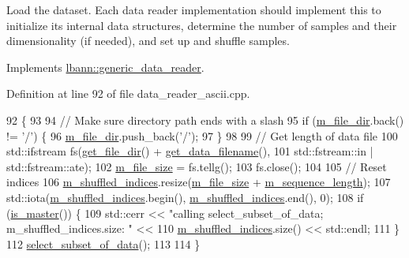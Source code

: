 Load the dataset. Each data reader implementation should implement this to initialize its internal data structures, determine the number of samples and their dimensionality (if needed), and set up and shuffle samples. 

Implements \hyperlink{classlbann_1_1generic__data__reader_afeb47703d988a230a59859cbfc178215}{lbann\+::generic\+\_\+data\+\_\+reader}.



Definition at line 92 of file data\+\_\+reader\+\_\+ascii.\+cpp.


\begin{DoxyCode}
92                         \{
93 
94   \textcolor{comment}{// Make sure directory path ends with a slash}
95   \textcolor{keywordflow}{if} (\hyperlink{classlbann_1_1generic__data__reader_a252002ec211d67606b80bc481a27e820}{m\_file\_dir}.back() != \textcolor{charliteral}{'/'}) \{
96     \hyperlink{classlbann_1_1generic__data__reader_a252002ec211d67606b80bc481a27e820}{m\_file\_dir}.push\_back(\textcolor{charliteral}{'/'});
97   \}
98 
99   \textcolor{comment}{// Get length of data file}
100   std::ifstream fs(\hyperlink{classlbann_1_1generic__data__reader_ab4c6c2d4ba40ece809ce896828c8ff03}{get\_file\_dir}() + \hyperlink{classlbann_1_1generic__data__reader_a56664e1b43f3fe923cf6d652f14b40a9}{get\_data\_filename}(),
101                    std::fstream::in | std::fstream::ate);
102   \hyperlink{classlbann_1_1ascii__reader_af684694c8c7faef296bf5af2530471f3}{m\_file\_size} = fs.tellg();
103   fs.close();
104 
105   \textcolor{comment}{// Reset indices}
106   \hyperlink{classlbann_1_1generic__data__reader_aaab6aeff67ffff1c689336851fec2c57}{m\_shuffled\_indices}.resize(\hyperlink{classlbann_1_1ascii__reader_af684694c8c7faef296bf5af2530471f3}{m\_file\_size} + 
      \hyperlink{classlbann_1_1ascii__reader_a5788fa7418a086de968929d0d4cb4fa4}{m\_sequence\_length});
107   std::iota(\hyperlink{classlbann_1_1generic__data__reader_aaab6aeff67ffff1c689336851fec2c57}{m\_shuffled\_indices}.begin(), \hyperlink{classlbann_1_1generic__data__reader_aaab6aeff67ffff1c689336851fec2c57}{m\_shuffled\_indices}.end(), 0);
108   \textcolor{keywordflow}{if} (\hyperlink{classlbann_1_1generic__data__reader_ae82c40eebc05e2f0c1198afcc7a7f009}{is\_master}()) \{
109     std::cerr << \textcolor{stringliteral}{"calling select\_subset\_of\_data; m\_shuffled\_indices.size: "} <<
110       \hyperlink{classlbann_1_1generic__data__reader_aaab6aeff67ffff1c689336851fec2c57}{m\_shuffled\_indices}.size() << std::endl;
111   \}
112   \hyperlink{classlbann_1_1generic__data__reader_aa28fdeeb6af492540f507e49adff5d6c}{select\_subset\_of\_data}();
113 
114 \}
\end{DoxyCode}
